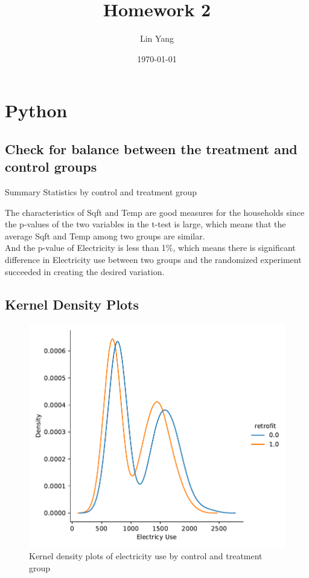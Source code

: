 \documentclass{article}
\title{Homework 2}
\author{Lin Yang}
\date{\today}
\begin{document}
  
\maketitle
\section{Python}

\subsection{Check for balance between the treatment and control groups}

\begin{table}[ht]
	\centering
	
	\caption{Summary Statistics by control and treatment group}
\end{table}
The characteristics of Sqft and Temp are good measures for the households since the p-values of the two variables in the t-test is large, which means that the average Sqft and Temp among two groups are similar. \\ And the p-value of Electricity is less than 1\%, which means there is significant difference in Electricity use between two groups and the randomized experiment succeeded in creating the desired variation.
	
\subsection{Kernel Density Plots}

\begin{figure}[ht]
	\centering
	\includegraphics[scale = 0.5]{q2.pdf}
	\caption{Kernel density plots of electricity use by control and treatment group}
\end{figure}
\end{document}

